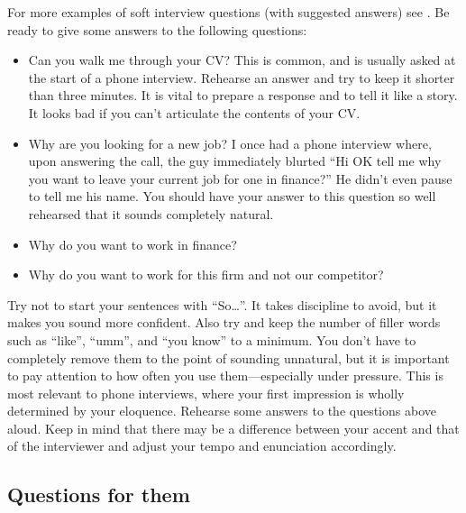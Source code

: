 \documentclass[a4paper]{article}
\begin{document}
For more examples of soft interview questions (with suggested answers) see \citet{JoshiQA}.
Be ready to give some answers to the following questions:
\begin{itemize}
  \item Can you walk me through your CV?
  This is common, and is usually asked at the start of a phone interview.
  Rehearse an answer and try to keep it shorter than three minutes.
  It is vital to prepare a response and to tell it like a story.
  It looks bad if you can't articulate the contents of your CV.
  \item Why are you looking for a new job?
  I once had a phone interview where, upon answering the call, the guy immediately blurted ``Hi OK tell me why you want to leave your current job for one in finance?''
  He didn't even pause to tell me his name.
  You should have your answer to this question so well rehearsed that it sounds completely natural.
  \item Why do you want to work in finance?
  \item Why do you want to work for this firm and not our competitor?
\end{itemize}
%
Try not to start your sentences with ``So\ldots''.
It takes discipline to avoid, but it makes you sound more confident.
Also try and keep the number of filler words such as ``like'', ``umm'', and ``you know'' to a minimum.
You don't have to completely remove them to the point of sounding unnatural, but it is important to pay attention to how often you use them---especially under pressure.
This is most relevant to phone interviews, where your first impression is wholly determined by your eloquence.
Rehearse some answers to the questions above aloud.
Keep in mind that there may be a difference between your accent and that of the interviewer and adjust your tempo and enunciation accordingly.

\subsection{Questions for them}
\end{document}
